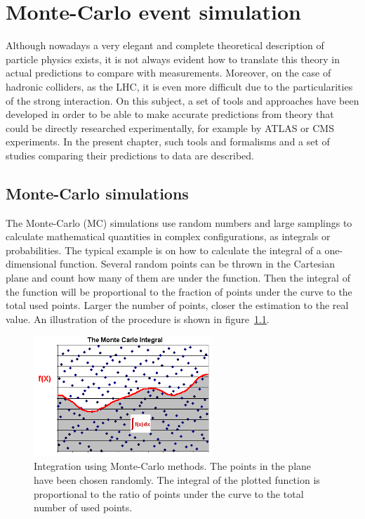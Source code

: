 \chapter[MC event generation]{Monte-Carlo event simulation}
\label{chap:MC}

Although nowadays a very elegant and complete theoretical description of particle physics exists, it is not always evident how to translate this theory in actual predictions to compare with measurements. Moreover, on the case of hadronic colliders, as the LHC, it is even more difficult due to the particularities of the strong interaction. On this subject, a set of tools and approaches have been developed in order to be able to make accurate predictions from theory that could be directly researched experimentally, for example by ATLAS or CMS experiments. In the present chapter, such tools and formalisms and a set of studies comparing their predictions to data are described. 

\section{Monte-Carlo simulations}
\label{sec:MC}

The Monte-Carlo (MC) simulations use random numbers and large samplings to calculate mathematical quantities in complex configurations, as integrals or probabilities. The typical example is on how to calculate the integral of a one-dimensional function. Several random points can be thrown in the Cartesian plane and count how many of them are under the function. Then the integral of the function will be proportional to the fraction of points under the curve to the total used points. Larger the number of points, closer the estimation to the real value. An illustration of the procedure is shown in figure~\ref{fig:mc_int}.

\begin{figure}[!Hhtbp]
  \begin{center}
    \includegraphics[width=0.6\textwidth]{figs/mc_integral.png}
    \caption{Integration using Monte-Carlo methods. The points in the plane have been chosen randomly. The integral of the plotted function is proportional to the ratio of points under the curve to the total number of used points.}
    \label{fig:mc_int}
  \end{center}
\end{figure}

